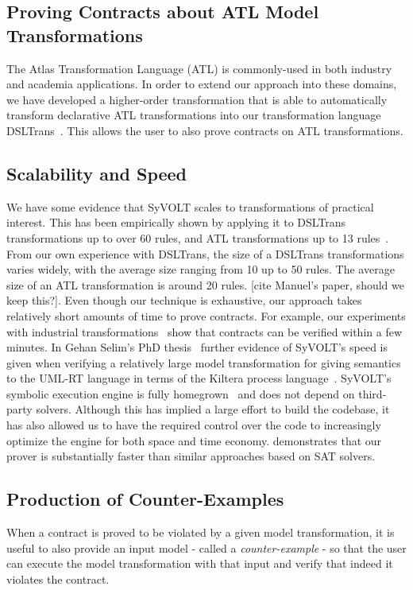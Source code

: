 \subsection{Proving Contracts about ATL Model Transformations}
The Atlas Transformation Language (ATL) is commonly-used in both industry and
academia applications. In order to extend our approach into these domains, we
have developed a higher-order transformation that is able to automatically
transform declarative ATL transformations into our transformation language
DSLTrans~\cite{Oakes}. This allows the user to also prove contracts on
ATL transformations.

\subsection{Scalability and Speed}

We have some evidence that SyVOLT scales to transformations of practical
interest. This has been empirically shown by applying it to DSLTrans
transformations up to over 60 rules, and ATL transformations up to 13
rules~\cite{Oakes}. From our own experience with DSLTrans, the size of a
DSLTrans transformations varies widely, with the average size ranging from 10 up
to 50 rules. The average size of an ATL transformation is around 20 rules. [cite
Manuel's paper, should we keep this?].
Even though our technique is exhaustive, our approach takes relatively short
amounts of time to prove contracts. For example, our experiments with industrial
transformations~\cite{Oakes} show that contracts can be verified within a few
minutes. In Gehan Selim's PhD thesis~\cite{Selim2015}
further evidence of SyVOLT's speed is given when verifying a relatively large
model transformation for giving semantics to the UML-RT language in terms of
the Kiltera process language~\cite{PosseDingel2014}. SyVOLT's symbolic execution
engine is fully homegrown~\cite{LucioVang} and does not depend on third-party
solvers. Although this has implied a large effort to build the codebase, it has
also allowed us to have the required control over the code to increasingly
optimize the engine for both space and time economy. \cite{Selim2014}
demonstrates that our prover is substantially faster than similar approaches based on SAT solvers.


\subsection{Production of Counter-Examples}

When a contract is proved to be violated by a given model transformation, it is
useful to also provide an input model - called a \emph{counter-example} - so
that the user can execute the model transformation with that input and verify
that indeed it violates the contract.

